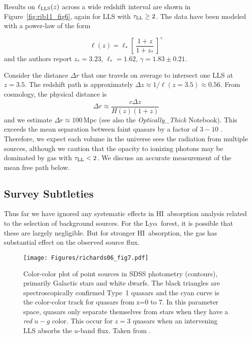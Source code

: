 \documentclass[graybox]{svmult}
\newcommand{\HI}{H{\sc I}}
\def\lya{Ly$\alpha$}
\def\ltk{\left [ \,}
\def\rtk{\, \right  ] }
\begin{document}
Results on $\ell_{\rm LLS}(z)$ across a wide redshift interval
are shown in Figure~\ref{fig:rib11_fig6}, again for
LLS with $\tau_{\rm LL} \ge 2$.
The data have been modeled with a 
power-law of the form

  	\begin{equation}
  	\ell(z) = \ell_* \ltk \frac{1+z}{1+z_*} \rtk^\gamma
  	\label{eqn:lz}
  	\end{equation}
and the authors report
$z_* = 3.23$, $\ell_* = 1.62$, $\gamma = 1.83 \pm 0.21$.

Consider the distance $\Delta r$ that one travels
on average to intersect one LLS at $z=3.5$.
The redshift path is approximately
$\Delta z \approx 1 / \ell(z=3.5) \approx 0.56$.
From cosmology,  the physical distance is
\begin{equation}
\Delta r \approx \frac{c \Delta z}{H(z) (1+z)}
\end{equation}
and we estimate $\Delta r \approx 100$\,Mpc
(see also the {\it Optically\_Thick} Notebook).
This exceeds the mean separation between faint
quasars by a factor of $3-10$ \cite{fg09}.
Therefore, we expect each volume in the universe sees
the radiation from multiple sources, although we caution
that the opacity to ionizing photons may be dominated
by gas with $\tau_{\rm LL} <2$.  We discuss an 
accurate measurement of the mean free path below.

\subsection{Survey Subtleties}

Thus far we have ignored any systematic effects in \HI\
absorption analysis related to the selection of background
sources.  For the \lya\ forest, it is possible that these
are largely negligible.    But for stronger \HI\ absorption,
the gas has substantial effect on the observed source
flux.  

%
\begin{figure}[b]
\sidecaption
\texttt{[image: Figures/richards06\_fig7.pdf]}
%
%
\caption{Color-color plot of point sources in SDSS photometry
(contours), primarily Galactic stars and white dwarfs.
The black triangles are spectroscopically confirmed Type~1 quasars
and the cyan curve is the color-color track for quasars
from z=0 to 7.  In this parameter space, quasars only separate
themselves from stars when they have a {\it red} $u-g$ color.
This occur for $z=3$ quasars when an intervening LLS absorbs
the $u$-band flux.
Taken from \cite{richards06}.
}
\label{fig:stack_saw}       %
\end{figure}
\end{document}
